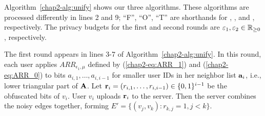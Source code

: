Algorithm~\ref{chap2-alg:unify} shows our three algorithms.
These algorithms are processed differently in lines 2 and 9; ``F'', ``O'', ``T'' are shorthands for \AlgOne{}, \AlgTwo{}, and \AlgThree{}, respectively.
The privacy budgets for the first and second
rounds are $\varepsilon_1, \varepsilon_2 \in \mathbb{R}_{\ge0}$, respectively.

The first round appears in lines 3-7 of Algorithm~\ref{chap2-alg:unify}.
In this round, each user applies
$ARR_{\epsilon_1, \mu}$
defined by (\ref{chap2-eq:ARR_1}) and (\ref{chap2-eq:ARR_0}) to bits $a_{i,1}, \ldots, a_{i,i-1}$ for smaller user IDs in her neighbor list $\mathbf{a}_i$, i.e., lower triangular part of $\mathbf{A}$.
Let $\mathbf{r}_i = (r_{i,1}, \ldots, r_{i,i-1}) \in \{0,1\}^{i-1}$ be the obfuscated bits of $v_i$.
User $v_i$ uploads $\mathbf{r}_i$ to the server.
Then the server combines the noisy edges together, forming $E' = \{(v_j, v_k) : r_{k,j} = 1, j < k\}$.

